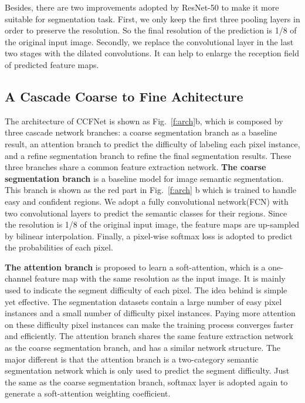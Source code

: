 \documentclass[10.5pt,compsoc]{TsT}
\theoremstyle{mystyle}
\begin{document}
{Besides, there are two improvements adopted by ResNet-50 to make it more suitable for segmentation task. First, we only keep the first three pooling layers in order to preserve the resolution. So the final resolution of the prediction is 1/8 of the original input image. Secondly, we replace the convolutional layer in the last two stages with the dilated convolutions. It can help to enlarge the reception field of predicted feature maps.



\subsection{A Cascade Coarse to Fine Achitecture}
\label{s:ccfnet}
\noindent

The architecture of CCFNet is shown as Fig.~\ref{f:arch}b, which is composed by three cascade network branches: a coarse segmentation branch as a baseline result, an attention branch to predict the difficulty of labeling each pixel instance, and a refine segmentation branch to refine the final segmentation results. 
These three branches share a common feature extraction network.
\textbf{The coarse segmentation branch} is a baseline model for image semantic segmentation.
This branch is shown as the red part in Fig.~\ref{f:arch} b which is trained to handle easy and confident regions. We adopt a fully convolutional network(FCN) with two convolutional layers to predict the semantic classes for their regions. 
Since the resolution is 1/8 of the original input image, the feature maps are up-sampled by bilinear interpolation.
Finally, a pixel-wise softmax loss is adopted to predict the probabilities of each pixel.


\textbf{The attention branch} is proposed to learn a soft-attention, which is a one-channel feature map with the same resolution as the input image. 
It is mainly used to indicate the segment difficulty of each pixel.
The idea behind is simple yet effective. 
The segmentation datasets contain a large number of easy pixel instances and a small number of difficulty pixel instances.
Paying more attention on these difficulty pixel instances can make the training process converges faster and efficiently.
The attention branch shares the same feature extraction network as the coarse segmentation branch, and has a similar network structure.
The major different is that the attention branch is a two-category semantic segmentation network which is only used to predict the segment difficulty.
Just the same as the coarse segmentation branch, softmax layer is adopted again to generate a soft-attention weighting coefficient.


}
\end{document}
